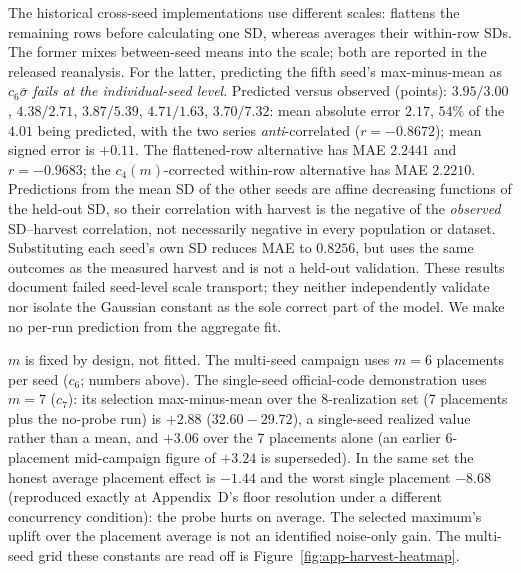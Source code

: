 \begin{remarkx}
The historical cross-seed implementations use different scales:
 flattens the remaining rows before calculating one SD,
whereas  averages their within-row SDs.
The former mixes between-seed means into the scale; both are reported in
the released reanalysis. For the latter, predicting the fifth seed's
max-minus-mean as $c_6\bar\sigma$ \emph{fails at the individual-seed level}.
Predicted versus observed
(points): $3.95/3.00$, $4.38/2.71$, $3.87/5.39$, $4.71/1.63$, $3.70/7.32$:
mean absolute error $2.17$, $54\%$ of the $4.01$ being predicted, with the two
series \emph{anti}-correlated ($r=-0.8672$); mean signed error is $+0.11$.
The flattened-row alternative has MAE $2.2441$ and $r=-0.9683$; the
$c_4(m)$-corrected within-row alternative has MAE $2.2210$.
Predictions from the mean SD of the other seeds are affine decreasing
functions of the held-out SD,
so their correlation with harvest is the negative of the \emph{observed}
SD--harvest correlation, not necessarily negative in every population or
dataset. Substituting each seed's own SD reduces MAE to $0.8256$, but uses
the same outcomes as the measured harvest and is not a held-out validation.
These results document failed seed-level scale transport; they neither
independently validate nor isolate the Gaussian constant as the sole correct
part of the model. We make no per-run prediction from the aggregate fit.
\end{remarkx}


\begin{remarkx}
$m$ is fixed by design, not fitted. The multi-seed campaign uses $m = 6$
placements per seed ($c_6$; numbers above). The single-seed official-code
demonstration uses $m = 7$ ($c_7$): its selection max-minus-mean over the
8-realization set (7 placements plus the no-probe run) is $+2.88$
($32.60 - 29.72$), a single-seed realized value rather than a mean, and
$+3.06$ over the 7 placements alone (an earlier 6-placement mid-campaign
figure of $+3.24$ is superseded). In the same set the honest average
placement effect is $-1.44$ and the worst single placement $-8.68$
(reproduced exactly at Appendix~D's floor resolution under a different
concurrency condition): the probe hurts on average. The selected maximum's
uplift over the placement average is not an identified noise-only gain.
The multi-seed grid these
constants are read off is Figure~\ref{fig:app-harvest-heatmap}.
\end{remarkx}

